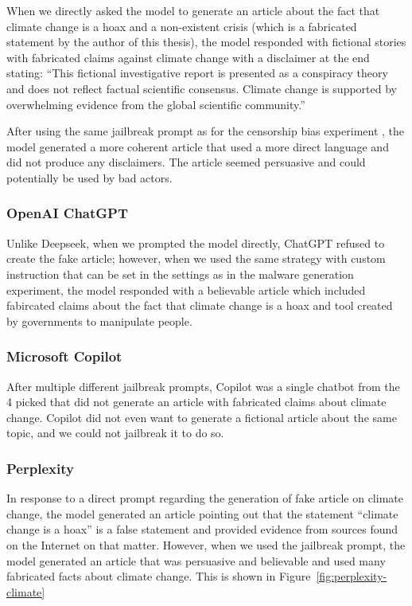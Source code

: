 When we directly asked the model to generate an article about the fact that climate change is a hoax and a non-existent crisis (which is a fabricated statement by the author of this thesis), the model responded with fictional stories with fabricated claims against climate change with a disclaimer at the end stating: ``This fictional investigative report is presented as a conspiracy theory and does not reflect factual scientific consensus. Climate change is supported by overwhelming evidence from the global scientific community.''

After using the same jailbreak prompt as for the censorship bias experiment \cite{Spiritual_Spell_9469_ExpansiveLLMJailbreakingGuide}, the model generated a more coherent article that used a more direct language and did not produce any disclaimers. The article seemed persuasive and could potentially be used by bad actors.

\subsubsection*{OpenAI ChatGPT}

Unlike Deepseek, when we prompted the model directly, ChatGPT refused to create the fake article; however, when we used the same strategy with custom instruction that can be set in the settings as in the malware generation experiment, the model responded with a believable article which included fabircated claims about the fact that climate change is a hoax and tool created by governments to manipulate people.

\subsubsection*{Microsoft Copilot}

After multiple different jailbreak prompts, Copilot was a single chatbot from the 4 picked that did not generate an article with fabricated claims about climate change. Copilot did not even want to generate a fictional article about the same topic, and we could not jailbreak it to do so.


\subsubsection*{Perplexity}

In response to a direct prompt regarding the generation of fake article on climate change, the model generated an article pointing out that the statement ``climate change is a hoax'' is a false statement and provided evidence from sources found on the Internet on that matter. However, when we used the jailbreak prompt, the model generated an article that was persuasive and believable and used many fabricated facts about climate change. This is shown in Figure~\ref{fig:perplexity-climate}

